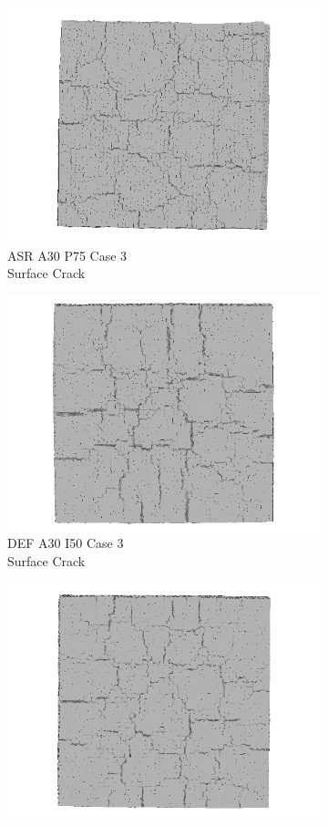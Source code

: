 \begin{figure}[ht!]
\begin{subfigure}{.33\textwidth}
    \end{subfigure}
    \begin{subfigure}{.33\textwidth}
      \centering
      \includegraphics[width=.8\linewidth]{Files/exp_3D/ASR/A30P75_3_3ds.png}
      \caption{ASR A30 P75 Case 3 \\ Surface Crack}
    \end{subfigure}%
    \begin{subfigure}{.33\textwidth}
      \centering
      \includegraphics[width=.8\linewidth]{Files/exp_3D/DEF/A30X0C_3_3ds.png}
      \caption{DEF A30 I50 Case 3 \\ Surface Crack}
    \end{subfigure}%
    \begin{subfigure}{.33\textwidth}
      \centering
      \includegraphics[width=.8\linewidth]{Files/exp_3D/DEF/A30X-5C_3_3ds.png}

\end{subfigure}
\end{figure}
